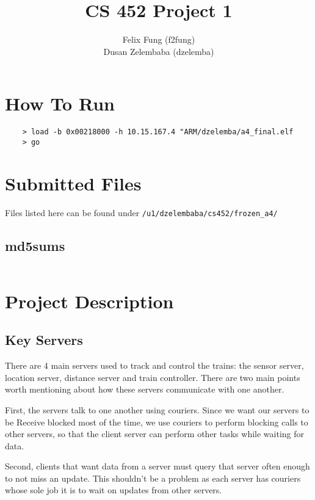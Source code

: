 \documentclass[letterpaper]{article}
\begin{document}
\title{CS 452 Project 1}
\author{Felix Fung (f2fung) \\ Dusan Zelembaba (dzelemba)}
\maketitle

\section{How To Run}
\begin{verbatim}
	> load -b 0x00218000 -h 10.15.167.4 "ARM/dzelemba/a4_final.elf
	> go
\end{verbatim}

\section{Submitted Files}

Files listed here can be found under \verb!/u1/dzelembaba/cs452/frozen_a4/!

\subsection{md5sums}
\begin{verbatim}

\end{verbatim}

\section{Project Description}

\subsection{Key Servers}

There are 4 main servers used to track and control the trains: the sensor server, location server, distance server and train controller. There are two main points worth mentioning about how these servers communicate with one another. 

First, the servers talk to one another using couriers. Since we want our servers to be Receive blocked most of the time, we use couriers to perform blocking calls to other servers, so that the client server can perform other tasks while waiting for data.

Second, clients that want data from a server must query that server often enough to not miss an update. This shouldn't be a problem as each server has couriers whose sole job it is to wait on updates from other servers.
\end{document}
